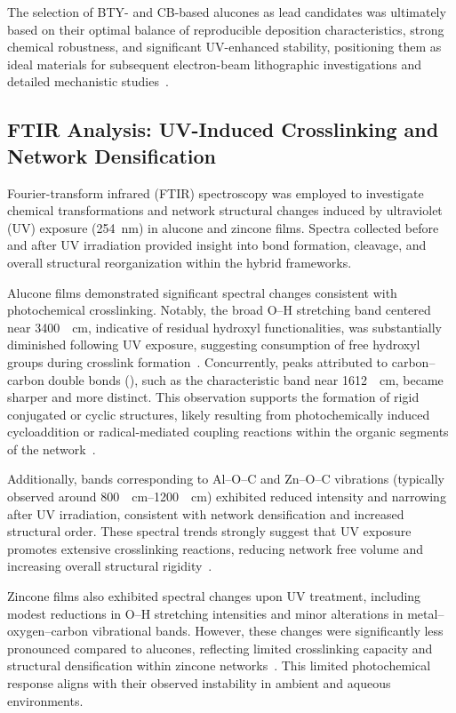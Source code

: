 The selection of BTY- and CB-based alucones as lead candidates was ultimately based on their optimal balance of reproducible deposition characteristics, strong chemical robustness, and significant UV-enhanced stability, positioning them as ideal materials for subsequent electron-beam lithographic investigations and detailed mechanistic studies~\cite{REF}.



\subsection{FTIR Analysis: UV-Induced Crosslinking and Network Densification}

Fourier-transform infrared (FTIR) spectroscopy was employed to investigate chemical transformations and network structural changes induced by ultraviolet (UV) exposure (\SI{254}{\nano\meter}) in alucone and zincone films. Spectra collected before and after UV irradiation provided insight into bond formation, cleavage, and overall structural reorganization within the hybrid frameworks.

Alucone films demonstrated significant spectral changes consistent with photochemical crosslinking. Notably, the broad O--H stretching band centered near \SI{3400}{\per\centi\meter}, indicative of residual hydroxyl functionalities, was substantially diminished following UV exposure, suggesting consumption of free hydroxyl groups during crosslink formation~\cite{REF}. Concurrently, peaks attributed to carbon--carbon double bonds (), such as the characteristic band near \SI{1612}{\per\centi\meter}, became sharper and more distinct. This observation supports the formation of rigid conjugated or cyclic structures, likely resulting from photochemically induced cycloaddition or radical-mediated coupling reactions within the organic segments of the network~\cite{REF}.

Additionally, bands corresponding to Al--O--C and Zn--O--C vibrations (typically observed around \SIrange{800}{1200}{\per\centi\meter}) exhibited reduced intensity and narrowing after UV irradiation, consistent with network densification and increased structural order. These spectral trends strongly suggest that UV exposure promotes extensive crosslinking reactions, reducing network free volume and increasing overall structural rigidity~\cite{REF}.

Zincone films also exhibited spectral changes upon UV treatment, including modest reductions in O--H stretching intensities and minor alterations in metal--oxygen--carbon vibrational bands. However, these changes were significantly less pronounced compared to alucones, reflecting limited crosslinking capacity and structural densification within zincone networks~\cite{REF}. This limited photochemical response aligns with their observed instability in ambient and aqueous environments.

